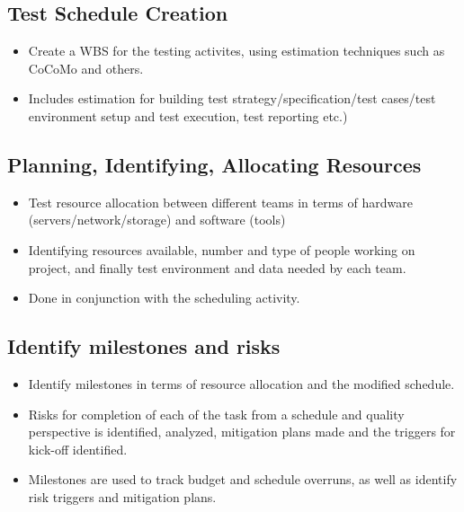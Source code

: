 \documentclass{article}
\begin{document}
\subsection{Test Schedule Creation}
\begin{itemize}
    \item Create a WBS for the testing activites, using estimation techniques such as CoCoMo and others. 
    
    \item Includes estimation for building test strategy/specification/test cases/test environment setup and test execution, test reporting etc.)
\end{itemize}

\subsection{Planning, Identifying, Allocating Resources}
\begin{itemize}
    \item Test resource allocation between different teams in terms of hardware (servers/network/storage) and software (tools) 
    
    \item Identifying resources available, number and type of people working on project, and finally test environment and data needed by each team.
    
    \item Done in conjunction with the scheduling activity. 
\end{itemize}

\subsection{Identify milestones and risks}
\begin{itemize}
    \item Identify milestones in terms of resource allocation and the modified schedule. 
    
    \item Risks for completion of each of the task from a schedule and quality perspective is identified, analyzed, mitigation plans made and the triggers for kick-off identified.
    
    \item Milestones are used to track budget and schedule overruns, as well as identify risk triggers and mitigation plans. 
\end{itemize}
\end{document}
